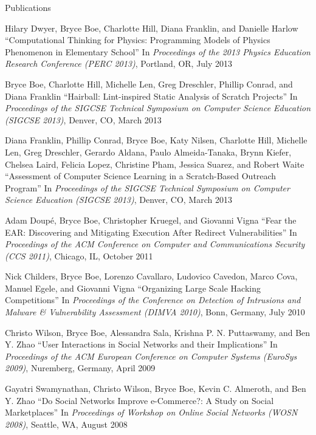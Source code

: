 \begin{vitae}
{\begin{vitaesection}{Publications}
\vspace{-0.1cm}
  \item Hilary Dwyer, Bryce Boe, Charlotte Hill, Diana Franklin, and Danielle
    Harlow ``Computational Thinking for Physics: Programming Models of Physics
    Phenomenon in Elementary School'' In \emph{Proceedings of the 2013 Physics
      Education Research Conference (PERC 2013)}, Portland, OR, July 2013
  \item Bryce Boe, Charlotte Hill, Michelle Len, Greg Dreschler, Phillip
    Conrad, and Diana Franklin ``Hairball: Lint-inspired Static Analysis of
    Scratch Projects'' In \emph{Proceedings of the  SIGCSE Technical
      Symposium on Computer Science Education (SIGCSE 2013)}, Denver, CO, March
    2013
  \item Diana Franklin, Phillip Conrad, Bryce Boe, Katy Nilsen, Charlotte Hill,
    Michelle Len, Greg Dreschler, Gerardo Aldana, Paulo Almeida-Tanaka, Brynn
    Kiefer, Chelsea Laird, Felicia Lopez, Christine Pham, Jessica Suarez, and
    Robert Waite ``Assessment of Computer Science Learning in a Scratch-Based
    Outreach Program'' In \emph{Proceedings of the  SIGCSE Technical
      Symposium on Computer Science Education (SIGCSE 2013)}, Denver, CO, March
    2013
  \item Adam Doup\'e, Bryce Boe, Christopher Kruegel, and Giovanni Vigna ``Fear
    the EAR: Discovering and Mitigating Execution After Redirect
    Vulnerabilities'' In \emph{Proceedings of the  ACM Conference on
      Computer and Communications Security (CCS 2011)}, Chicago, IL, October
    2011
  \item Nick Childers, Bryce Boe, Lorenzo Cavallaro, Ludovico Cavedon, Marco
    Cova, Manuel Egele, and Giovanni Vigna ``Organizing Large Scale Hacking
    Competitions'' In \emph{Proceedings of the  Conference on Detection
      of Intrusions and Malware \& Vulnerability Assessment (DIMVA 2010)},
    Bonn, Germany, July 2010
  \item Christo Wilson, Bryce Boe, Alessandra Sala, Krishna P. N. Puttaswamy,
    and Ben Y. Zhao ``User Interactions in Social Networks and their
    Implications'' In \emph{Proceedings of the  ACM European Conference
      on Computer Systems (EuroSys 2009)}, Nuremberg, Germany, April 2009
  \item Gayatri Swamynathan, Christo Wilson, Bryce Boe, Kevin C. Almeroth, and
    Ben Y. Zhao ``Do Social Networks Improve e-Commerce?: A Study on Social
    Marketplaces'' In \emph{Proceedings of  Workshop on Online Social
      Networks (WOSN 2008)}, Seattle, WA, August 2008
\end{vitaesection}

}
\end{vitae}
